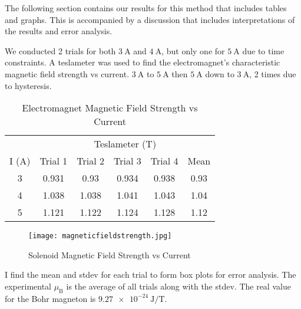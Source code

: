 \documentclass[11pt]{article}
\begin{document}
	The following section contains our results for this method that includes tables and graphs. This is accompanied by a discussion that includes interpretations of the results and error analysis.
	
	We conducted 2 trials for both $\qty{3}{\ampere}$ and $\qty{4}{\ampere}$, but only one for $\qty{5}{\ampere}$ due to time constraints. A teslameter was used to find the electromagnet's characteristic magnetic field strength vs current. $\qty{3}{\ampere}$ to $\qty{5}{\ampere}$ then $\qty{5}{\ampere}$ down to $\qty{3}{\ampere}$, 2 times due to hysteresis.
	
	\begin{table}[htbp]
		\centering
		\caption{Electromagnet Magnetic Field Strength vs Current}
		\begin{tabular}{cccccc}
			\toprule
			& \multicolumn{5}{c}{Teslameter ($\unit{\tesla}$)} \\
			\cmidrule{2-6}    I ($\unit{\ampere}$) & Trial 1 & Trial 2 & Trial 3 & Trial 4 & Mean \\
			\midrule
			3 & 0.931 & 0.93 & 0.934 & 0.938 & 0.93 \\
			4 & 1.038 & 1.038 & 1.041 & 1.043 & 1.04 \\
			5 & 1.121 & 1.122 & 1.124 & 1.128 & 1.12 \\
			\bottomrule
		\end{tabular}%
		\label{tab:Electromagnet}%
	\end{table}%
	
	\begin{figure}[htbp]
		\centering
		\caption{Solenoid Magnetic Field Strength vs Current}
		\texttt{[image: magneticfieldstrength.jpg]}
	\end{figure}
	 
\clearpage

	I find the mean and stdev for each trial to form box plots for error analysis. The experimental $\mu_\mathrm{B}$ is the average of all trials along with the stdev. The real value for the Bohr magneton is $\qty{9.27e-24}{\joule\per\tesla}$.
	
\end{document}
